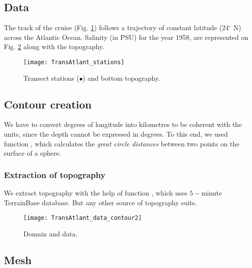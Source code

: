 \subsection{Data}

The track of the cruise (Fig. \ref{fig:transectprofiles}) follows a trajectory of constant latitude (24$^{\circ}$ N) across the Atlantic Ocean. Salinity (in PSU) for the year 1958, are represented on Fig. \ref{fig:domaindata} along with the topography. 

\begin{figure}[htpb]
\centering
\texttt{[image: TransAtlant\_stations]}
\caption{Transect stations ($\bullet$) and bottom topography.\label{fig:transectprofiles}}
\end{figure}

\subsection{Contour creation}

We have to convert degrees of longitude into kilometres to be coherent with the units, since the depth cannot be expressed in degrees. To this end, we used \matlab function , which calculates the \textit{great circle distances} between two points on the surface of a sphere.  

\subsubsection{Extraction of topography}

We extract topography with the help of \matlab function  , which uses $5-$minute TerrainBase database. But any other source of topography suits.
				
\begin{figure}[H]
\centering
\texttt{[image: TransAtlant\_data\_contour2]}
\caption{Domain and data.\label{fig:domaindata}}
\end{figure}


%
%

\subsection{Mesh} 

